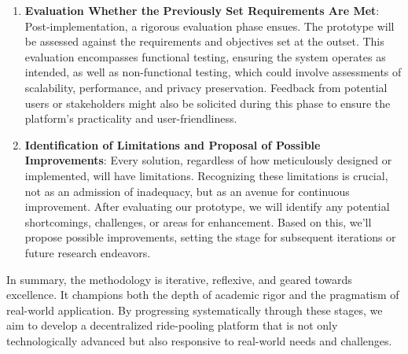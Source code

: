 \begin{enumerate}
    \item \textbf{Evaluation Whether the Previously Set Requirements Are Met}: 
    Post-implementation, a rigorous evaluation phase ensues. The prototype will be assessed against the requirements and objectives set at the outset. This evaluation encompasses functional testing, ensuring the system operates as intended, as well as non-functional testing, which could involve assessments of scalability, performance, and privacy preservation. Feedback from potential users or stakeholders might also be solicited during this phase to ensure the platform's practicality and user-friendliness.

    \item \textbf{Identification of Limitations and Proposal of Possible Improvements}:
    Every solution, regardless of how meticulously designed or implemented, will have limitations. Recognizing these limitations is crucial, not as an admission of inadequacy, but as an avenue for continuous improvement. After evaluating our prototype, we will identify any potential shortcomings, challenges, or areas for enhancement. Based on this, we'll propose possible improvements, setting the stage for subsequent iterations or future research endeavors.
\end{enumerate}

In summary, the methodology is iterative, reflexive, and geared towards excellence. It champions both the depth of academic rigor and the pragmatism of real-world application. By progressing systematically through these stages, we aim to develop a decentralized ride-pooling platform that is not only technologically advanced but also responsive to real-world needs and challenges.
